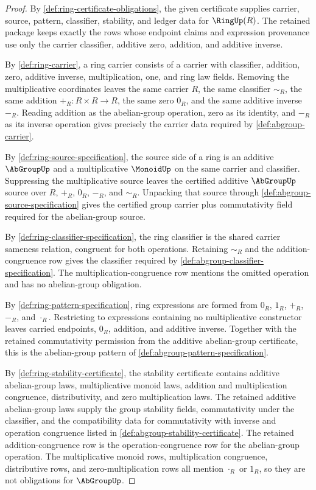 \begin{proof}
By \autoref{def:ring-certificate-obligations}, the given certificate supplies carrier, source, pattern, classifier, stability, and ledger data for $\RingUp(R)$. The retained package keeps exactly the rows whose endpoint claims and expression provenance use only the carrier classifier, additive zero, addition, and additive inverse.

By \autoref{def:ring-carrier}, a ring carrier consists of a carrier with classifier, addition, zero, additive inverse, multiplication, one, and ring law fields. Removing the multiplicative coordinates leaves the same carrier $R$, the same classifier $\sim_R$, the same addition $+_R:R\times R\to R$, the same zero $0_R$, and the same additive inverse $-_R$. Reading addition as the abelian-group operation, zero as its identity, and $-_R$ as its inverse operation gives precisely the carrier data required by \autoref{def:abgroup-carrier}.

By \autoref{def:ring-source-specification}, the source side of a ring is an additive $\AbGroupUp$ and a multiplicative $\MonoidUp$ on the same carrier and classifier. Suppressing the multiplicative source leaves the certified additive $\AbGroupUp$ source over $R$, $+_R$, $0_R$, $-_R$, and $\sim_R$. Unpacking that source through \autoref{def:abgroup-source-specification} gives the certified group carrier plus commutativity field required for the abelian-group source.

By \autoref{def:ring-classifier-specification}, the ring classifier is the shared carrier sameness relation, congruent for both operations. Retaining $\sim_R$ and the addition-congruence row gives the classifier required by \autoref{def:abgroup-classifier-specification}. The multiplication-congruence row mentions the omitted operation and has no abelian-group obligation.

By \autoref{def:ring-pattern-specification}, ring expressions are formed from $0_R$, $1_R$, $+_R$, $-_R$, and $\cdot_R$. Restricting to expressions containing no multiplicative constructor leaves carried endpoints, $0_R$, addition, and additive inverse. Together with the retained commutativity permission from the additive abelian-group certificate, this is the abelian-group pattern of \autoref{def:abgroup-pattern-specification}.

By \autoref{def:ring-stability-certificate}, the stability certificate contains additive abelian-group laws, multiplicative monoid laws, addition and multiplication congruence, distributivity, and zero multiplication laws. The retained additive abelian-group laws supply the group stability fields, commutativity under the classifier, and the compatibility data for commutativity with inverse and operation congruence listed in \autoref{def:abgroup-stability-certificate}. The retained addition-congruence row is the operation-congruence row for the abelian-group operation. The multiplicative monoid rows, multiplication congruence, distributive rows, and zero-multiplication rows all mention $\cdot_R$ or $1_R$, so they are not obligations for $\AbGroupUp$.


\end{proof}
